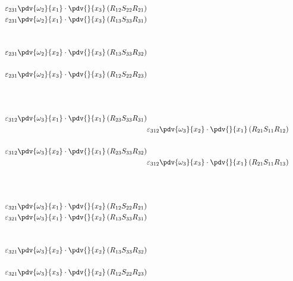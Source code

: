 \begin{equation}
\begin{split}
		\\ 
						\\ 
		&		&		&\\ 
				\varepsilon_{231}\pdv{\omega_{2}}{x_{1}}\cdot\pdv{}{x_{3}}\left(R_{12}S_{22}R_{21}\right)
		\\ 
						\varepsilon_{231}\pdv{\omega_{2}}{x_{1}}\cdot\pdv{}{x_{3}}\left(R_{13}S_{33}R_{31}\right)
\\ 
		&		&		&\\ 
						\\ 
						\varepsilon_{231}\pdv{\omega_{2}}{x_{2}}\cdot\pdv{}{x_{3}}\left(R_{13}S_{33}R_{32}\right)
\\ 
		&		&		&\\ 
				\varepsilon_{231}\pdv{\omega_{2}}{x_{3}}\cdot\pdv{}{x_{3}}\left(R_{12}S_{22}R_{23}\right)
		\\ 
						\\ 
		&		&		&\\ 
						\\ 
						\varepsilon_{312}\pdv{\omega_{3}}{x_{1}}\cdot\pdv{}{x_{1}}\left(R_{23}S_{33}R_{31}\right)
\\ 
		&\varepsilon_{312}\pdv{\omega_{3}}{x_{2}}\cdot\pdv{}{x_{1}}\left(R_{21}S_{11}R_{12}\right)
		&		&\\ 
						\\ 
						\varepsilon_{312}\pdv{\omega_{3}}{x_{2}}\cdot\pdv{}{x_{1}}\left(R_{23}S_{33}R_{32}\right)
\\ 
		&\varepsilon_{312}\pdv{\omega_{3}}{x_{3}}\cdot\pdv{}{x_{1}}\left(R_{21}S_{11}R_{13}\right)
		&		&\\ 
						\\ 
						\\ 
		&		&		&\\ 
				\varepsilon_{321}\pdv{\omega_{3}}{x_{1}}\cdot\pdv{}{x_{2}}\left(R_{12}S_{22}R_{21}\right)
		\\ 
						\varepsilon_{321}\pdv{\omega_{3}}{x_{1}}\cdot\pdv{}{x_{2}}\left(R_{13}S_{33}R_{31}\right)
\\ 
		&		&		&\\ 
						\\ 
						\varepsilon_{321}\pdv{\omega_{3}}{x_{2}}\cdot\pdv{}{x_{2}}\left(R_{13}S_{33}R_{32}\right)
\\ 
		&		&		&\\ 
				\varepsilon_{321}\pdv{\omega_{3}}{x_{3}}\cdot\pdv{}{x_{2}}\left(R_{12}S_{22}R_{23}\right)
		\\ 
						\\ 
	\end{split}
\end{equation}
